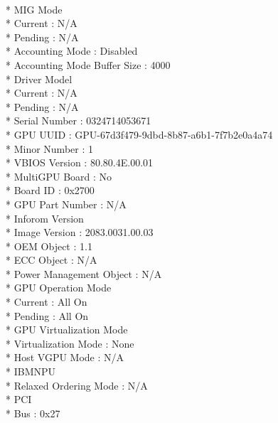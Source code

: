 \documentclass{article}
\begin{document}
   \\*  MIG Mode
     \\*    Current                           : N/A
    \\*     Pending                           : N/A
   \\*  Accounting Mode                       : Disabled
    \\* Accounting Mode Buffer Size           : 4000
   \\*  Driver Model
     \\*    Current                           : N/A
    \\*     Pending                           : N/A
    \\* Serial Number                         : 0324714053671
   \\*  GPU UUID                              : GPU-67d3f479-9dbd-8b87-a6b1-7f7b2e0a4a74
   \\*  Minor Number                          : 1
   \\*  VBIOS Version                         : 80.80.4E.00.01
   \\*  MultiGPU Board                        : No
  \\*   Board ID                              : 0x2700
   \\*  GPU Part Number                       : N/A
  \\*   Inforom Version
   \\*      Image Version                     : 2083.0031.00.03
   \\*      OEM Object                        : 1.1
     \\*    ECC Object                        : N/A
    \\*     Power Management Object           : N/A
    \\* GPU Operation Mode
   \\*      Current                           : All On
    \\*     Pending                           : All On
   \\*  GPU Virtualization Mode
   \\*      Virtualization Mode               : None
    \\*     Host VGPU Mode                    : N/A
  \\*   IBMNPU
    \\*     Relaxed Ordering Mode             : N/A
   \\*  PCI
   \\*      Bus                               : 0x27
\end{document}
